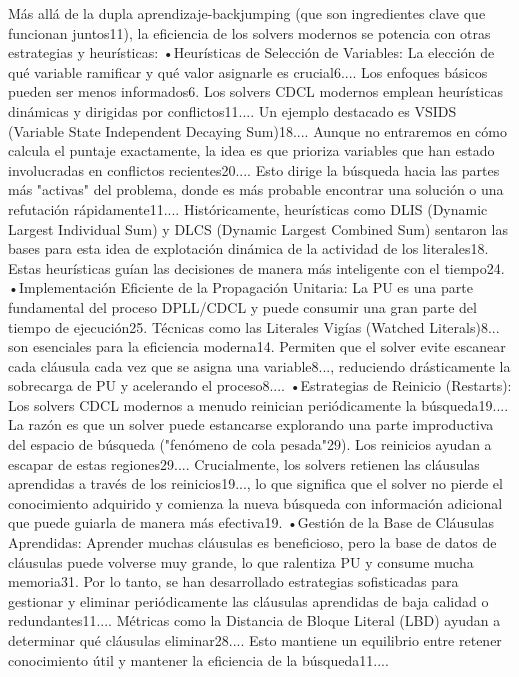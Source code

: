Más allá de la dupla aprendizaje-backjumping (que son ingredientes clave que funcionan juntos11), la eficiencia de los solvers modernos se potencia con otras estrategias y heurísticas:
•Heurísticas de Selección de Variables: La elección de qué variable ramificar y qué valor asignarle es crucial6.... Los enfoques básicos pueden ser menos informados6. Los solvers CDCL modernos emplean heurísticas dinámicas y dirigidas por conflictos11.... Un ejemplo destacado es VSIDS (Variable State Independent Decaying Sum)18.... Aunque no entraremos en cómo calcula el puntaje exactamente, la idea es que prioriza variables que han estado involucradas en conflictos recientes20.... Esto dirige la búsqueda hacia las partes más "activas" del problema, donde es más probable encontrar una solución o una refutación rápidamente11.... Históricamente, heurísticas como DLIS (Dynamic Largest Individual Sum) y DLCS (Dynamic Largest Combined Sum) sentaron las bases para esta idea de explotación dinámica de la actividad de los literales18. Estas heurísticas guían las decisiones de manera más inteligente con el tiempo24.
•Implementación Eficiente de la Propagación Unitaria: La PU es una parte fundamental del proceso DPLL/CDCL y puede consumir una gran parte del tiempo de ejecución25. Técnicas como las Literales Vigías (Watched Literals)8... son esenciales para la eficiencia moderna14. Permiten que el solver evite escanear cada cláusula cada vez que se asigna una variable8..., reduciendo drásticamente la sobrecarga de PU y acelerando el proceso8....
•Estrategias de Reinicio (Restarts): Los solvers CDCL modernos a menudo reinician periódicamente la búsqueda19.... La razón es que un solver puede estancarse explorando una parte improductiva del espacio de búsqueda ("fenómeno de cola pesada"29). Los reinicios ayudan a escapar de estas regiones29.... Crucialmente, los solvers retienen las cláusulas aprendidas a través de los reinicios19..., lo que significa que el solver no pierde el conocimiento adquirido y comienza la nueva búsqueda con información adicional que puede guiarla de manera más efectiva19.
•Gestión de la Base de Cláusulas Aprendidas: Aprender muchas cláusulas es beneficioso, pero la base de datos de cláusulas puede volverse muy grande, lo que ralentiza PU y consume mucha memoria31. Por lo tanto, se han desarrollado estrategias sofisticadas para gestionar y eliminar periódicamente las cláusulas aprendidas de baja calidad o redundantes11.... Métricas como la Distancia de Bloque Literal (LBD) ayudan a determinar qué cláusulas eliminar28.... Esto mantiene un equilibrio entre retener conocimiento útil y mantener la eficiencia de la búsqueda11....
